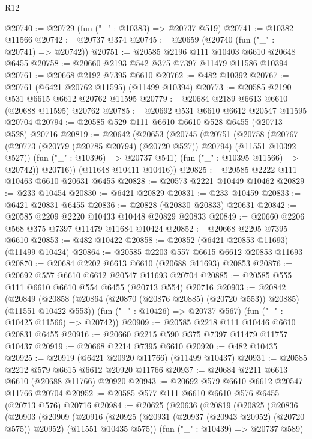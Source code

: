\begin{lexlean}{R12}
\begin{coremodule}
@20740 := @20729 (fun ("_" : @10383) => @20737 @519)
@20741 := @10382 @11566
@20742 := @20737 @374
@20745 := @20659 (@20740 (fun ("_" : @20741) => @20742))
@20751 := @20585 @2196 @111 @10403 @6610 @20648 @6455
@20758 := @20660 @2193 @542 @375 @7397 @11479 @11586 @10394
@20761 := @20668 @2192 @7395 @6610
@20762 := @482 @10392
@20767 := @20761 (@6421 @20762 @11595) (@11499 @10394)
@20773 := @20585 @2190 @531 @6615 @6612 @20762 @11595
@20779 := @20684 @2189 @6613 @6610 (@20688 @11595) @20762
@20785 := @20692 @531 @6610 @6612 @20547 @11595 @20704
@20794 := @20585 @529 @111 @6610 @6610 @528 @6455 (@20713 @528) @20716
@20819 := @20642
    (@20653
      (@20745
        (@20751
          (@20758
            (@20767 (@20773 (@20779 (@20785 @20794) (@20720 @527)) @20794) (@11551 @10392 @527))
            (fun ("_" : @10396) => @20737 @541)
            (fun ("_" : @10395 @11566) => @20742))
          @20716))
      (@11648 @10411 @10416))
@20825 := @20585 @2222 @111 @10463 @6610 @20631 @6455
@20828 := @20573 @2221 @10449 @10462
@20829 := @233 @10454
@20830 := @6421 @20829
@20831 := @233 @10459
@20833 := @6421 @20831 @6455
@20836 := @20828 (@20830 @20833) @20631
@20842 := @20585 @2209 @2220 @10433 @10448 @20829 @20833
@20849 := @20660 @2206 @568 @375 @7397 @11479 @11684 @10424
@20852 := @20668 @2205 @7395 @6610
@20853 := @482 @10422
@20858 := @20852 (@6421 @20853 @11693) (@11499 @10424)
@20864 := @20585 @2203 @557 @6615 @6612 @20853 @11693
@20870 := @20684 @2202 @6613 @6610 (@20688 @11693) @20853
@20876 := @20692 @557 @6610 @6612 @20547 @11693 @20704
@20885 := @20585 @555 @111 @6610 @6610 @554 @6455 (@20713 @554) @20716
@20903 := @20842
    (@20849
      (@20858 (@20864 (@20870 (@20876 @20885) (@20720 @553)) @20885) (@11551 @10422 @553))
      (fun ("_" : @10426) => @20737 @567)
      (fun ("_" : @10425 @11566) => @20742))
@20909 := @20585 @2218 @111 @10446 @6610 @20831 @6455
@20916 := @20660 @2215 @590 @375 @7397 @11479 @11757 @10437
@20919 := @20668 @2214 @7395 @6610
@20920 := @482 @10435
@20925 := @20919 (@6421 @20920 @11766) (@11499 @10437)
@20931 := @20585 @2212 @579 @6615 @6612 @20920 @11766
@20937 := @20684 @2211 @6613 @6610 (@20688 @11766) @20920
@20943 := @20692 @579 @6610 @6612 @20547 @11766 @20704
@20952 := @20585 @577 @111 @6610 @6610 @576 @6455 (@20713 @576) @20716
@20984 := @20625
    (@20636
      (@20819
        (@20825
          (@20836
            (@20903
              (@20909
                (@20916
                  (@20925
                    (@20931 (@20937 (@20943 @20952) (@20720 @575)) @20952)
                    (@11551 @10435 @575))
                  (fun ("_" : @10439) => @20737 @589)

\end{coremodule}
\end{lexlean}
